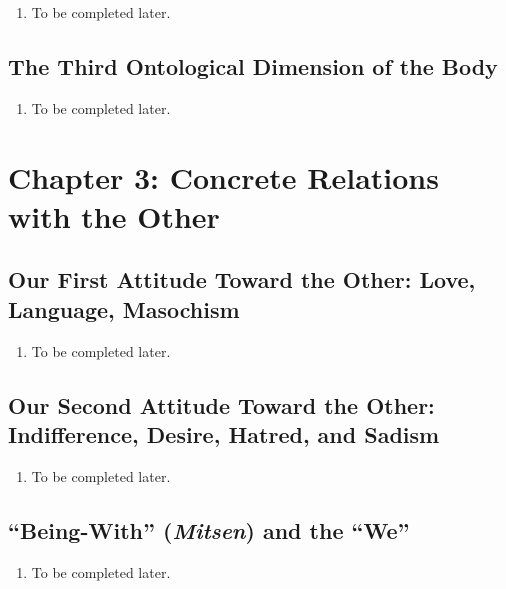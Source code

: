 \begin{enumerate}
  \item To be completed later.
\end{enumerate}

\subsection{The Third Ontological Dimension of the Body}

\begin{enumerate}
  \item To be completed later.
\end{enumerate}

\section{Chapter 3: Concrete Relations with the Other}

\subsection{Our First Attitude Toward the Other: Love, Language, Masochism}

\begin{enumerate}
  \item To be completed later.
\end{enumerate}

\subsection{Our Second Attitude Toward the Other: Indifference, Desire, Hatred, and Sadism}

\begin{enumerate}
  \item To be completed later.
\end{enumerate}

\subsection{\enquote{Being-With} (\emph{Mitsen}) and the \enquote{We}}

\begin{enumerate}
  \item To be completed later.
\end{enumerate}
